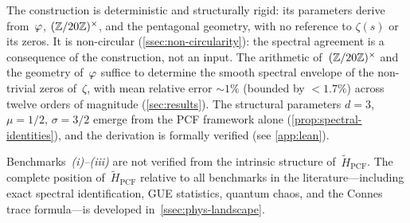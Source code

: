 The construction is deterministic and structurally rigid: its
parameters derive from~$\varphi$, $(\mathbb{Z}/20\mathbb{Z})^\times$, and the pentagonal
geometry, with no reference to $\zeta(s)$ or its zeros.  It is
non-circular (\cref{ssec:non-circularity}): the spectral agreement
is a consequence of the construction, not an input.  The arithmetic
of~$(\mathbb{Z}/20\mathbb{Z})^\times$ and the geometry of~$\varphi$ suffice to determine the
smooth spectral envelope of the non-trivial zeros of~$\zeta$, with
mean relative error ${\sim}1\%$ (bounded by ${<}1.7\%$) across twelve
orders of magnitude (\cref{sec:results}).  The structural parameters 
$d=3$, $\mu=1/2$,
$\sigma=3/2$ emerge from the PCF framework alone
(\cref{prop:spectral-identities}), and the derivation is
formally verified (see \cref{app:lean}).

Benchmarks~\emph{(i)--(iii)} are not verified from the intrinsic
structure of~$\tilde{H}_{\mathrm{PCF}}$.  The complete position
of~$\tilde{H}_{\mathrm{PCF}}$ relative to all benchmarks in the
literature---including exact spectral identification, GUE statistics, quantum chaos, and the Connes trace formula---is developed
in~\cref{ssec:phys-landscape}.
